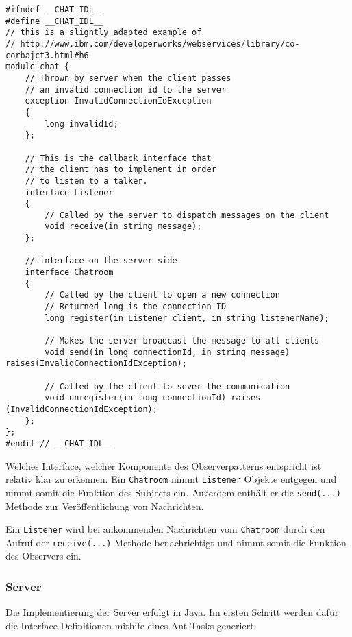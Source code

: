 \begin{lstlisting}[language={[CORBA]IDL}, caption=chat.idl]
#ifndef __CHAT_IDL__
#define __CHAT_IDL__
// this is a slightly adapted example of
// http://www.ibm.com/developerworks/webservices/library/co-corbajct3.html#h6
module chat {
    // Thrown by server when the client passes
    // an invalid connection id to the server
    exception InvalidConnectionIdException
    {
        long invalidId;
    };

    // This is the callback interface that
    // the client has to implement in order
    // to listen to a talker.
    interface Listener
    {
        // Called by the server to dispatch messages on the client
        void receive(in string message);
    };

    // interface on the server side
    interface Chatroom
    {
        // Called by the client to open a new connection
        // Returned long is the connection ID
        long register(in Listener client, in string listenerName);

        // Makes the server broadcast the message to all clients
        void send(in long connectionId, in string message) raises(InvalidConnectionIdException);

        // Called by the client to sever the communication
        void unregister(in long connectionId) raises (InvalidConnectionIdException);
    };
};
#endif // __CHAT_IDL__
\end{lstlisting}

Welches Interface, welcher Komponente des Observerpatterns entspricht ist relativ klar zu erkennen.
Ein \texttt{Chatroom} nimmt \texttt{Listener} Objekte entgegen und nimmt somit die Funktion des Subjects ein.
Au\ss erdem enth\"alt er die \texttt{send(...)} Methode zur Ver\"offentlichung von Nachrichten.

Ein \texttt{Listener} wird bei ankommenden Nachrichten vom \texttt{Chatroom} durch den Aufruf der \texttt{receive(...)} Methode benachrichtigt und nimmt somit die Funktion des Observers ein.

\subsubsection{Server}
Die Implementierung der Server erfolgt in Java.
Im ersten Schritt werden daf\"ur die Interface Definitionen mithife eines Ant-Tasks generiert:


